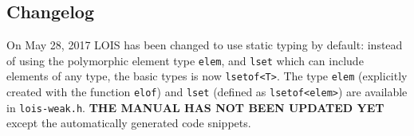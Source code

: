 \subsection{Changelog}
On May 28, 2017 LOIS has been changed to use static typing by default: instead of using
the polymorphic element type \verb|elem|, and \verb|lset| which can include elements of
any type, the basic types is now \verb|lsetof<T>|. The type \verb|elem| (explicitly created
with the function \verb|elof|) and \verb|lset| (defined as \verb|lsetof<elem>|) are
available in \verb|lois-weak.h|. {\bf THE MANUAL HAS NOT BEEN UPDATED YET} except
the automatically generated code snippets.
